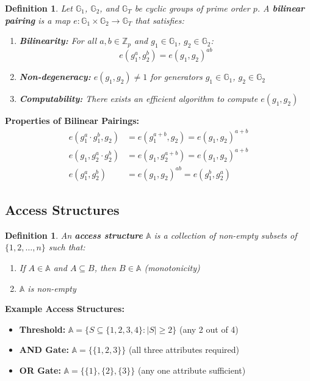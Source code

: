 \documentclass[11pt,a4paper]{article}
\newtheorem{definition}[theorem]{Definition}
\begin{document}
\begin{definition}
Let $\mathbb{G}_1$, $\mathbb{G}_2$, and $\mathbb{G}_T$ be cyclic groups of prime order $p$. A \textbf{bilinear pairing} is a map $e: \mathbb{G}_1 \times \mathbb{G}_2 \rightarrow \mathbb{G}_T$ that satisfies:
\begin{enumerate}
    \item \textbf{Bilinearity:} For all $a, b \in \mathbb{Z}_p$ and $g_1 \in \mathbb{G}_1$, $g_2 \in \mathbb{G}_2$:
    \[e(g_1^a, g_2^b) = e(g_1, g_2)^{ab}\]
    \item \textbf{Non-degeneracy:} $e(g_1, g_2) \neq 1$ for generators $g_1 \in \mathbb{G}_1$, $g_2 \in \mathbb{G}_2$
    \item \textbf{Computability:} There exists an efficient algorithm to compute $e(g_1, g_2)$
\end{enumerate}
\end{definition}

\begin{mathbox}
\textbf{Properties of Bilinear Pairings:}
\begin{align*}
e(g_1^a \cdot g_1^b, g_2) &= e(g_1^{a+b}, g_2) = e(g_1, g_2)^{a+b} \\
e(g_1, g_2^a \cdot g_2^b) &= e(g_1, g_2^{a+b}) = e(g_1, g_2)^{a+b} \\
e(g_1^a, g_2^b) &= e(g_1, g_2)^{ab} = e(g_1^b, g_2^a)
\end{align*}
\end{mathbox}

\subsection{Access Structures}

\begin{definition}
An \textbf{access structure} $\mathbb{A}$ is a collection of non-empty subsets of $\{1, 2, \ldots, n\}$ such that:
\begin{enumerate}
    \item If $A \in \mathbb{A}$ and $A \subseteq B$, then $B \in \mathbb{A}$ (monotonicity)
    \item $\mathbb{A}$ is non-empty
\end{enumerate}
\end{definition}

\begin{examplebox}
\textbf{Example Access Structures:}
\begin{itemize}
    \item \textbf{Threshold:} $\mathbb{A} = \{S \subseteq \{1,2,3,4\} : |S| \geq 2\}$ (any 2 out of 4)
    \item \textbf{AND Gate:} $\mathbb{A} = \{\{1,2,3\}\}$ (all three attributes required)
    \item \textbf{OR Gate:} $\mathbb{A} = \{\{1\}, \{2\}, \{3\}\}$ (any one attribute sufficient)
\end{itemize}
\end{examplebox}
\end{document}
